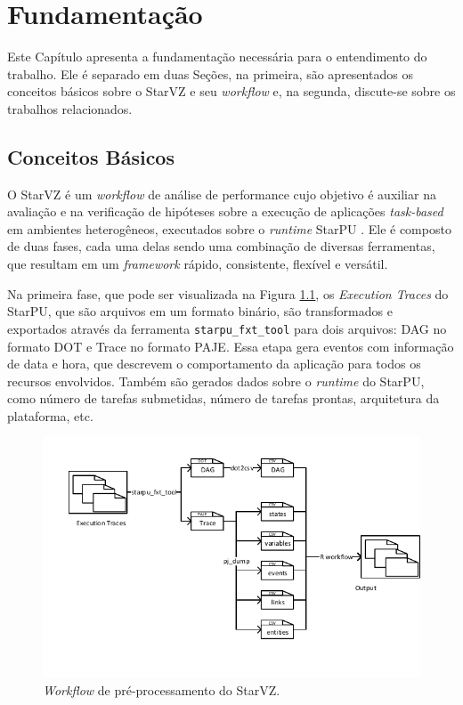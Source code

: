 
\chapter{Fundamentação} \label{ch:fundamentation}

Este Capítulo apresenta a fundamentação necessária para o entendimento do trabalho. 
Ele é separado em duas Seções, na primeira, são apresentados os conceitos básicos 
sobre o StarVZ e seu \emph{workflow} e, na segunda, discute-se sobre os trabalhos 
relacionados.

\section{Conceitos Básicos} \label{sect:basic-concepts}

O StarVZ \cite{ref:starvz} é um \emph{workflow} de análise de performance cujo 
objetivo é auxiliar na avaliação e na verificação de hipóteses sobre a execução de 
aplicações \emph{task-based} em ambientes heterogêneos, executados sobre o
\emph{runtime} StarPU \cite{ref:starpu}. Ele é composto de duas fases, cada uma 
delas sendo uma combinação de diversas ferramentas, que resultam em um \emph{framework}
rápido, consistente, flexível e versátil.

Na primeira fase, que pode ser visualizada na Figura \ref{fig:starvz-workflow1}, os 
\emph{Execution Traces} do StarPU, que são arquivos em um formato binário, são transformados
e exportados através da ferramenta \texttt{starpu\_fxt\_tool} para dois arquivos: DAG no formato DOT 
e Trace no formato PAJE. Essa etapa gera eventos com informação de data e hora, que 
descrevem o comportamento da aplicação para todos os recursos envolvidos. Também são gerados 
dados sobre o \emph{runtime} do StarPU, como número de tarefas submetidas,
número de tarefas prontas, arquitetura da plataforma, etc.

\begin{figure}[ht]
 \centerline{\includegraphics[width=1\textwidth]{./img/step1-final.pdf}}
 \caption{\emph{Workflow} de pré-processamento do StarVZ.}
 \label{fig:starvz-workflow1}
\end{figure}

